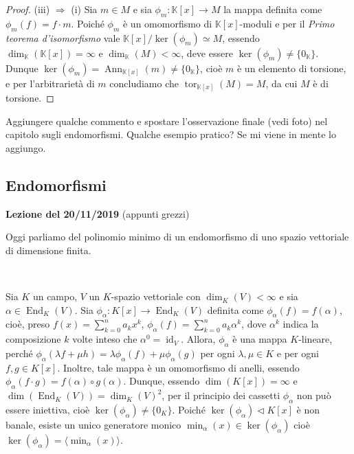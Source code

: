 \documentclass{article}
\theoremstyle{definition}
\newcommand{\tor}{\operatorname{tor}}
\newcommand{\Ann}{\operatorname{Ann}}
\begin{document}
\begin{proof}
\vspace{0.5mm}

\noindent (iii) $\Rightarrow$ (i) Sia $m\in M$ e sia $\phi_m\colon \mathbb{K}[x]\to M$ la mappa definita come $\phi_m(f)=f\cdot m$. Poiché $\phi_m$ è un omomorfismo di $\mathbb{K}[x]$-moduli e per il \emph{Primo teorema d'isomorfismo} vale $\mathbb{K}[x]/\ker(\phi_m)\simeq M$, essendo $\operatorname{dim}_{\mathbb{K}}(\mathbb{K}[x])=\infty$ e $\operatorname{dim}_{\mathbb{K}}(M)<\infty$, deve essere $\ker(\phi_m)\neq \{0_{\mathbb{K}}\}$. Dunque $\ker(\phi_m)=\Ann_{\mathbb{K}[x]}(m)\neq \{0_{\mathbb{K}}\}$, cioè $m$ è un elemento di torsione, e per l'arbitrarietà di $m$ concludiamo che $\tor_{\mathbb{K}[x]}(M)=M$, da cui $M$ è di torsione.
\end{proof}

\noindent Aggiungere qualche commento e spostare l'osservazione finale (vedi foto) nel capitolo sugli endomorfismi. Qualche esempio pratico? Se mi viene in mente lo aggiungo.

\clearpage

\subsection{Endomorfismi}

\noindent \textbf{Lezione del 20/11/2019} (appunti grezzi)

\noindent Oggi parliamo del polinomio minimo di un endomorfismo di uno spazio vettoriale di dimensione finita.

\

\noindent Sia $K$ un campo, $V$ un $K$-spazio vettoriale con $\operatorname{dim}_K(V)<\infty$ e sia $\alpha\in \operatorname{End}_K(V)$. Sia $\phi_{\alpha}\colon K[x]\to \operatorname{End}_K(V)$ definita come $\phi_{\alpha}(f)=f(\alpha)$, cioè, preso $f(x)=\sum\limits_{k=0}^n a_kx^k$, $\phi_{\alpha}(f)=\sum\limits_{k=0}^n a_k \alpha^k$, dove $\alpha^k$ indica la composizione $k$ volte inteso che $\alpha^0=\operatorname{id}_V$. Allora, $\phi_{\alpha}$ è una mappa $K$-lineare, perché $\phi_{\alpha}(\lambda f+\mu h)=\lambda \phi_{\alpha}(f)+\mu\phi_{\alpha}(g)$ per ogni $\lambda,\mu\in K$ e per ogni $f,g\in K[x]$. Inoltre, tale mappa è un omomorfismo di anelli, essendo $\phi_{\alpha}(f\cdot g)=f(\alpha)\circ g(\alpha)$. Dunque, essendo $\operatorname{dim}(K[x])=\infty$ e $\dim(\operatorname{End}_K(V))=\dim_{K}(V)^2$, per il principio dei cassetti $\phi_{\alpha}$ non può essere iniettiva, cioè $\ker(\phi_{\alpha})\neq \{0_{K}\}$. Poiché $\ker(\phi_{\alpha})\lhd K[x]$ è non banale, esiste un unico generatore monico $\min_{\alpha}(x)\in \ker(\phi_{\alpha})$ cioè $\ker(\phi_{\alpha})=\langle \min_{\alpha}(x) \rangle$.
\end{document}
